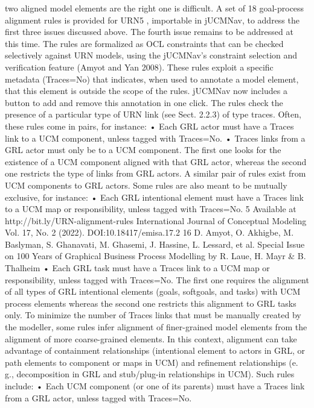 two aligned model elements are the right one is
difficult.
A set of 18 goal-process alignment rules is
provided for URN5 , importable in jUCMNav, to
address the first three issues discussed above. The
fourth issue remains to be addressed at this time.
The rules are formalized as OCL constraints that
can be checked selectively against URN models,
using the jUCMNav’s constraint selection and
verification feature (Amyot and Yan 2008).
These rules exploit a specific metadata
(Traces=No) that indicates, when used to annotate a model element, that this element is
outside the scope of the rules. jUCMNav now includes a button to add and remove this annotation
in one click. The rules check the presence of a
particular type of URN link (see Sect. 2.2.3) of
type traces. Often, these rules come in pairs, for
instance:
• Each GRL actor must have a Traces link
to a UCM component, unless tagged with
Traces=No.
• Traces links from a GRL actor must only be to
a UCM component.
The first one looks for the existence of a UCM
component aligned with that GRL actor, whereas
the second one restricts the type of links from
GRL actors. A similar pair of rules exist from
UCM components to GRL actors.
Some rules are also meant to be mutually exclusive, for instance:
• Each GRL intentional element must have a
Traces link to a UCM map or responsibility,
unless tagged with Traces=No.
5 Available at http://bit.ly/URN-alignment-rules
International Journal of Conceptual Modeling
Vol. 17, No. 2 (2022). DOI:10.18417/emisa.17.2
16 D. Amyot, O. Akhigbe, M. Baslyman, S. Ghanavati, M. Ghasemi, J. Hassine, L. Lessard, et al.
Special Issue on 100 Years of Graphical Business Process Modelling by R. Laue, H. Mayr & B. Thalheim
• Each GRL task must have a Traces link to a
UCM map or responsibility, unless tagged with
Traces=No.
The first one requires the alignment of all types of
GRL intentional elements (goals, softgoals, and
tasks) with UCM process elements whereas the
second one restricts this alignment to GRL tasks
only.
To minimize the number of Traces links that
must be manually created by the modeller, some
rules infer alignment of finer-grained model elements from the alignment of more coarse-grained
elements. In this context, alignment can take advantage of containment relationships (intentional
element to actors in GRL, or path elements to
component or maps in UCM) and refinement
relationships (e. g., decomposition in GRL and
stub/plug-in relationships in UCM). Such rules
include:
• Each UCM component (or one of its parents)
must have a Traces link from a GRL actor,
unless tagged with Traces=No.
